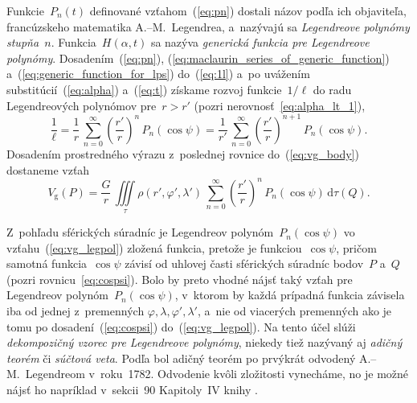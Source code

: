 \documentclass[a4paper, 12pt]{book}
\newcommand{\diff}{\mathrm d}
\newcommand{\gidx}{\mathrm g}
\begin{document}
Funkcie~$P_n(t)$ definované vzťahom~(\ref{eq:pn}) dostali názov podľa ich 
objaviteľa, francúzskeho matematika A.--M.~Legendrea, a~nazývajú sa 
\emph{Legendreove polynómy stupňa~$n$}.  Funkcia~$H(\alpha, t)$ sa nazýva 
\emph{generická funkcia pre Legendreove polynómy}.  Dosadením~(\ref{eq:pn}), 
(\ref{eq:maclaurin_series_of_generic_function}) 
a~(\ref{eq:generic_function_for_lps}) do~(\ref{eq:1l}) a~po uvážením 
substitúcií~(\ref{eq:alpha}) a~(\ref{eq:t}) získame rozvoj funkcie~$1 \slash 
\ell$ do radu Legendreových polynómov pre~$r > r'$ (pozri 
nerovnosť~\ref{eq:alpha_lt_1}),
%
\begin{equation}
\label{eq:1l_legpol}
\frac{1}{\ell} = \frac{1}{r} \, \sum_{n = 0}^\infty \left( \frac{r'}{r} 
\right)^{n} \, P_n(\cos\psi) = \frac{1}{r'} \, \sum_{n = 0}^\infty \left( 
\frac{r'}{r} \right)^{n + 1} \, P_n(\cos\psi){.}
\end{equation}
%
Dosadením prostredného výrazu z~poslednej rovnice do~(\ref{eq:vg_body}) 
dostaneme vzťah
%
\begin{equation}
\label{eq:vg_legpol}
V_\gidx(P) = \frac{G}{r} \, \iiint\limits_{\tau} \rho(r', \varphi', \lambda') 
\, \sum_{n = 0}^{\infty} \left( \frac{r'}{r} \right)^n \, P_n(\cos\psi) \, 
\diff\tau(Q){.}
\end{equation}

Z~pohľadu sférických súradníc je Legendreov polynóm~$P_n(\cos\psi)$ vo 
vzťahu~(\ref{eq:vg_legpol}) zložená funkcia, pretože je funkciou~$\cos\psi$, 
pričom samotná funkcia~$\cos\psi$ závisí od uhlovej časti sférických súradníc 
bodov~$P$ a~$Q$ (pozri rovnicu~\ref{eq:cospsi}).  Bolo by preto vhodné nájsť 
taký vzťah pre Legendreov polynóm~$P_n(\cos\psi)$,
v~ktorom by každá prípadná funkcia závisela iba od jednej z~premenných
$\varphi,  \lambda, \varphi', \lambda'$, a~nie od viacerých
premenných ako je tomu po dosadení~(\ref{eq:cospsi})
do~(\ref{eq:vg_legpol}).  Na tento účel slúži \emph{dekompozičný vzorec pre
Legendreove polynómy}, niekedy tiež nazývaný aj \emph{adičný teorém} či 
\emph{súčtová veta}.  Podľa \textcite{Hobson} bol adičný teorém po prvýkrát 
odvodený A.--M.~Legendreom v~roku~1782.  Odvodenie kvôli zložitosti vynecháme, 
no je možné nájsť ho napríklad v~sekcii~90 Kapitoly~IV knihy \textcite{Hobson}.
\end{document}
